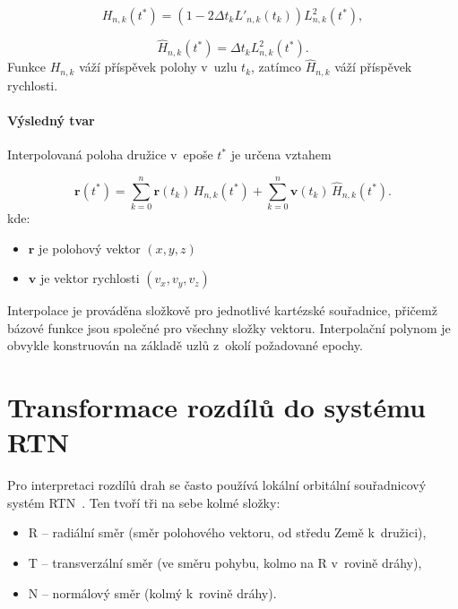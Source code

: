 \begin{equation}
H_{n,k}(t^\ast)
=
\left(
1 - 2 \Delta t_k L'_{n,k}(t_k)
\right)
L_{n,k}^2(t^\ast),
\end{equation}

\begin{equation}
\hat H_{n,k}(t^\ast)
=
\Delta t_k
L_{n,k}^2(t^\ast).
\end{equation}
Funkce $H_{n,k}$ váží příspěvek polohy v~uzlu $t_k$,
zatímco $\hat H_{n,k}$ váží příspěvek rychlosti.

\paragraph{Výsledný tvar}

Interpolovaná poloha družice v~epoše $t^\ast$ je určena vztahem

\begin{equation}
\mathbf r(t^\ast)
=
\sum_{k=0}^{n}
\mathbf r(t_k)\, H_{n,k}(t^\ast)
+
\sum_{k=0}^{n}
\mathbf v(t_k)\, \hat H_{n,k}(t^\ast).
\end{equation}
kde:
\begin{itemize}
    \item \(\mathbf{r}\) je polohový vektor \((x, y, z)\)
    \item \(\mathbf{v}\) je vektor rychlosti \((v_x, v_y, v_z)\)
\end{itemize}

Interpolace je prováděna složkově pro jednotlivé kartézské souřadnice, přičemž bázové funkce jsou společné pro všechny složky vektoru. Interpolační polynom je obvykle konstruován na základě uzlů z~okolí požadované epochy.

\section{Transformace rozdílů do systému RTN}

Pro interpretaci rozdílů drah se často používá lokální orbitální souřadnicový systém RTN~\cite{zeitlhoefler_2024_interpolation}. Ten tvoří tři na sebe kolmé složky:

\begin{itemize}
\item R – radiální směr (směr polohového vektoru, od středu Země k~družici),
\item T – transverzální směr (ve směru pohybu, kolmo na R v~rovině dráhy),
\item N – normálový směr (kolmý k~rovině dráhy).
\end{itemize}

